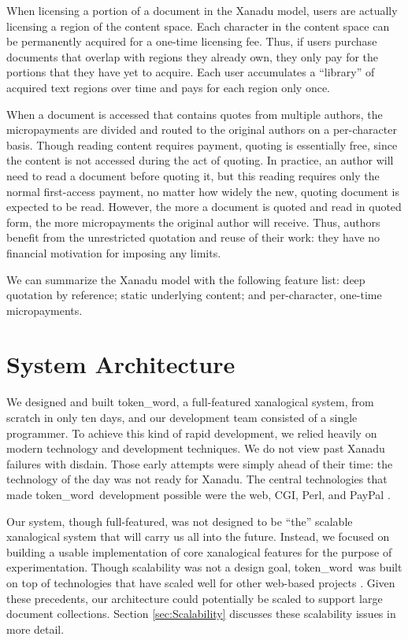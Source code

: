 \documentclass{acm_proc_article-sp}
\newcommand{\tokenWord}{token\_word}
\begin{document}
When licensing a portion of a document in the Xanadu model, users are actually licensing a region of the content space.
Each character in the content space can be permanently acquired for a one-time licensing fee.
Thus, if users purchase documents that overlap with regions they already own, they only pay for the portions that they have yet to acquire.
Each user accumulates a ``library'' of acquired text regions over time and pays for each region only once.

When a document is accessed that contains quotes from multiple authors, the micropayments are divided and routed to the original authors on a per-character basis. 
Though reading content requires payment, quoting is essentially free, since the content is not accessed during the act of quoting.
In practice, an author will need to read a document before quoting it, but this reading requires only the normal first-access payment, no matter how widely the new, quoting document is expected to be read.
However, the more a document is quoted and read in quoted form, the more micropayments the original author will receive.
Thus, authors benefit from the unrestricted quotation and reuse of their work:  they have no financial motivation for imposing any limits.

We can summarize the Xanadu model with the following feature list:  deep quotation by reference; static underlying content; and per-character, one-time micropayments.


\section{System Architecture}
We designed and built \tokenWord, a full-featured xanalogical system, from scratch in only ten days, and our development team consisted of a single programmer.
To achieve this kind of rapid development, we relied heavily on modern technology and development techniques.
We do not view past Xanadu failures with disdain.
Those early attempts were simply ahead of their time:  the technology of the day was not ready for Xanadu.
The central technologies that made \tokenWord \   development possible were the web, CGI, Perl, and PayPal \cite{paypal}.

Our system, though full-featured, was not designed to be ``the'' scalable xanalogical system that will carry us all into the future.
Instead, we focused on building a usable implementation of core xanalogical features for the purpose of experimentation.
Though scalability was not a design goal, \tokenWord \  was built on top of technologies that have scaled well for other web-based projects \cite{Everything2, WikiWikiWeb, Wikipedia}.
Given these precedents, our architecture could potentially be scaled to support large document collections.
Section \ref{sec:Scalability} discusses these scalability issues in more detail.
\end{document}
